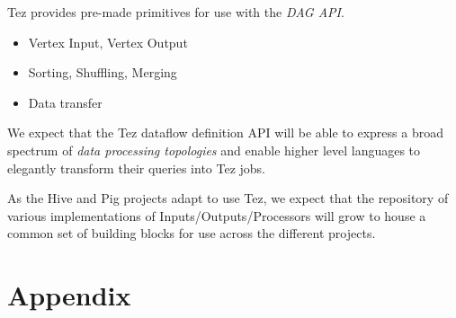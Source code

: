 \documentclass[twocolumn]{article}
\newcommand{\bi}{\begin{itemize}}
\newcommand{\ei}{\end{itemize}}
\newcommand{\ii}{\item}
\begin{document}
\noindent
Tez provides pre-made primitives for use with the \textit{DAG API}.

\bi
\ii Vertex Input,  Vertex Output
\ii Sorting,  Shuffling, Merging
\ii Data transfer 
\ei


We expect that the Tez dataflow definition API will be able to express a
broad spectrum of \emph{data processing topologies} and enable higher
level languages to elegantly transform their queries into Tez jobs.

As the Hive and Pig projects adapt to use Tez, we expect that the repository of various implementations of Inputs/Outputs/Processors will grow to house a common set of building blocks for use across the different projects.






\cleardoublepage

\section*{Appendix}



\end{document}
